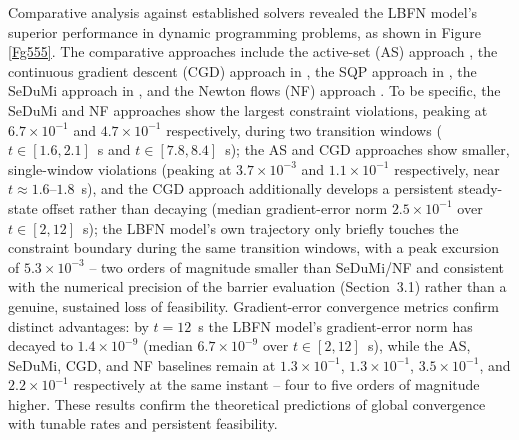 \documentclass[fleqn,10pt]{wlscirep}
\begin{document}
Comparative analysis against established solvers revealed the LBFN model's superior performance in dynamic programming problems, as shown in Figure \ref{Fg555}. The comparative approaches include the active-set (AS) approach \cite{act-se}, the continuous gradient descent (CGD) approach in \cite{CGDSD}, the SQP approach in \cite{SQP34}, the SeDuMi approach in \cite{SEDUME}, and the Newton flows (NF) approach \cite{new1}.
To be specific, the SeDuMi and NF approaches show the largest constraint violations, peaking at $6.7\times10^{-1}$ and $4.7\times10^{-1}$ respectively, during two transition windows ($t\in[1.6,2.1]$~s and $t\in[7.8,8.4]$~s); the AS and CGD approaches show smaller, single-window violations (peaking at $3.7\times10^{-3}$ and $1.1\times10^{-1}$ respectively, near $t\approx1.6$--$1.8$~s), and the CGD approach additionally develops a persistent steady-state offset rather than decaying (median gradient-error norm $2.5\times10^{-1}$ over $t\in[2,12]$~s); the LBFN model's own trajectory only briefly touches the constraint boundary during the same transition windows, with a peak excursion of $5.3\times10^{-3}$ -- two orders of magnitude smaller than SeDuMi/NF and consistent with the numerical precision of the barrier evaluation (Section~3.1) rather than a genuine, sustained loss of feasibility. Gradient-error convergence metrics confirm distinct advantages: by $t=12$~s the LBFN model's gradient-error norm has decayed to $1.4\times10^{-9}$ (median $6.7\times10^{-9}$ over $t\in[2,12]$~s), while the AS, SeDuMi, CGD, and NF baselines remain at $1.3\times10^{-1}$, $1.3\times10^{-1}$, $3.5\times10^{-1}$, and $2.2\times10^{-1}$ respectively at the same instant -- four to five orders of magnitude higher. These results confirm the theoretical predictions of global convergence with tunable rates and persistent feasibility.
\end{document}
